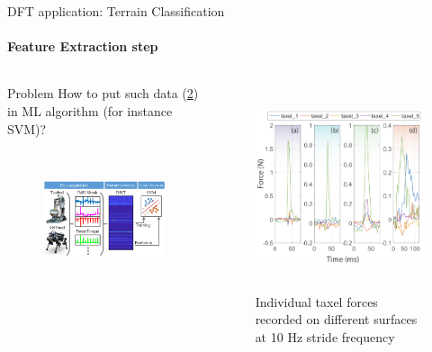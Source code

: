 \documentclass[aspectratio=169]{beamer}
\begin{document}
\begin{frame}[t]{DFT application: Terrain Classification}
\framesubtitle{Feature Extraction step}
\vspace{-0.6cm}
\begin{columns}[T,onlytextwidth]
    \begin{column}{0.59\textwidth}
        \begin{block}{Problem}
            How to put such data (\ref{fig:Force_data_from_robot.png}) in ML algorithm (for instance SVM)?
        \end{block}
        \vspace{-0.5cm}
        \begin{figure}[H]
            \centering\includegraphics[height=4cm,width=1\textwidth,keepaspectratio]{TC_algo.png}
            \label{fig:TC_algo.png}
        \end{figure}
    \end{column}
    \begin{column}{0.39\textwidth}
        \vspace{-0.75cm}
        \begin{figure}[H]
            \centering\includegraphics[height=6cm,width=1\textwidth,keepaspectratio]{Force_data_from_robot.png}
            \caption{Individual taxel forces recorded on different surfaces at 10 Hz stride frequency}
            \label{fig:Force_data_from_robot.png}
        \end{figure}
    \end{column}
\end{columns}
\end{frame}
\end{document}
